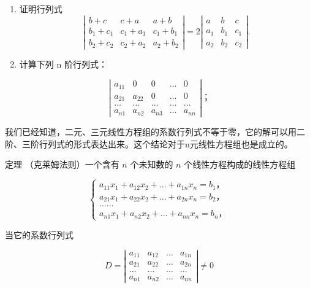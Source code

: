 \begin{enumerate}[start=2]
\item
  证明行列式
\[
\left| \begin{array}{ccc} b + c & c + a & a + b \\ b _ {1} + c _ {1} & c _ {1} + a _ {1} & c _ {1} + b _ {1} \\ b _ {2} + c _ {2} & c _ {2} + a _ {2} & a _ {2} + b _ {2} \end{array} \right| = 2 \left| \begin{array}{ccc} a & b & c \\ a _ {1} & b _ {1} & c _ {1} \\ a _ {2} & b _ {2} & c _ {2} \end{array} \right|.
\]
\item
  计算下列 n 阶行列式：
\end{enumerate}

\[
\left| \begin{array}{ccccc} a _ {11} & 0 & 0 & \dots & 0 \\ a _ {21} & a _ {22} & 0 & \dots & 0 \\ \dots & \dots & \dots & \dots & \dots \\ a _ {n 1} & a _ {n 2} & a _ {n 3} & \dots & a _ {n n} \end{array} \right|\text{；} \tag {2}
\]

我们已经知道，二元、三元线性方程组的系数行列式不等于零，它的解可以用二阶、三阶行列式的形式表达出来。这个结论对于n元线性方程组也是成立的。

定理 （克莱姆法则）一个含有 \(n\) 个未知数的 \(n\)
个线性方程构成的线性方程组

\[
\left\{ \begin{array}{l} a _ {11} x _ {1} + a _ {12} x _ {2} + \dots + a _ {1 n} x _ {n} = b _ {1}\text{，} \\ a _ {21} x _ {1} + a _ {22} x _ {2} + \dots + a _ {2 n} x _ {n} = b _ {2}\text{，} \\ \dots \dots \\ a _ {n 1} x _ {1} + a _ {n 2} x _ {2} + \dots + a _ {n n} x _ {n} = b _ {n}\text{，} \end{array} \right.
\]

当它的系数行列式

\[
D = \left| \begin{array}{cccc} a _ {11} & a _ {12} & \dots & a _ {1 n} \\ a _ {21} & a _ {22} & \dots & a _ {2 n} \\ \dots & \dots & \dots & \dots \\ a _ {n 1} & a _ {n 2} & \dots & a _ {n n} \end{array} \right| \neq 0
\]

